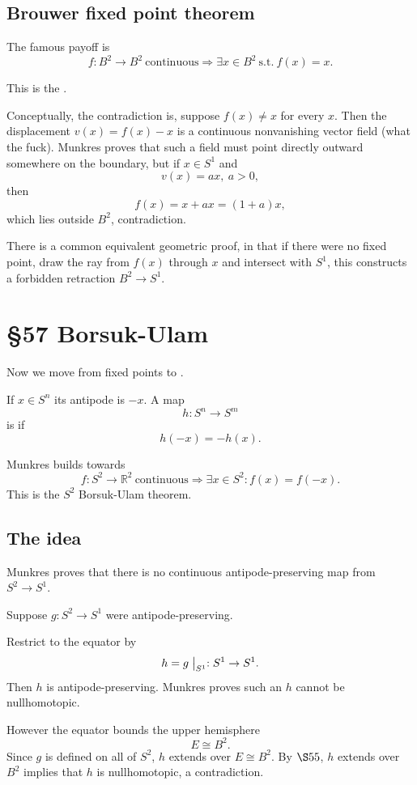 \documentclass[11pt]{article}
\begin{document}
\subsection{Brouwer fixed point theorem}

The famous payoff is 
\[
    f : B^2 \to B^2 \ \text{continuous} 
    \Rightarrow \exists x \in B^2 \ \text{s.t.} \ f(x) = x. 
\]

This is the . 

Conceptually, the contradiction is, suppose 
$f(x) \neq x$ for every $x$. Then the displacement 
$v(x) = f(x) - x$ is a continuous nonvanishing 
vector field (what the fuck). 
Munkres proves that such a field must point 
directly outward somewhere on the boundary, 
but if $x \in S^1$ and 
\[
    v(x) = ax, \ a > 0,
\]
then 
\[
    f(x) = x + ax = (1+a)x, 
\]
which lies outside $B^2$, contradiction. 

There is a common equivalent geometric proof, in that 
if there were no fixed point, draw the ray from 
$f(x)$ through $x$ and intersect with $S^1$, this 
constructs a forbidden retraction $B^2 \to S^1$. 

\section{\S57 Borsuk-Ulam}

Now we move from fixed points to . 

If $x \in S^n$ its antipode is $-x$. 
A map 
\[
    h : S^n \to S^m 
\]
is  if 
\[
    h(-x) = -h(x).
\]

Munkres builds towards 
\[
    f : S^2 \to \mathbb R^2 
    \ \text{continuous} 
    \Rightarrow \exists x \in S^2 
    : f(x) = f(-x). 
\]
This is the $S^2$ Borsuk-Ulam theorem. 

\subsection{The idea}

Munkres proves that there is no continuous 
antipode-preserving map from $S^2 \to S^1$. 

Suppose $g : S^2 \to S^1$ were antipode-preserving. 

Restrict to the equator by 
\[
    h = g \bigm|_{S^1} : S^1 \to S^1. 
\]
Then $h$ is antipode-preserving. 
Munkres proves such an $h$ cannot be nullhomotopic. 

However the equator bounds the upper hemisphere 
\[
    E \cong B^2. 
\]
Since $g$ is defined on all of $S^2$, $h$ extends over 
$E \cong B^2$. By $\S55$, $h$ extends over 
$B^2$ implies that $h$ is nullhomotopic, a 
contradiction. 
\end{document}
